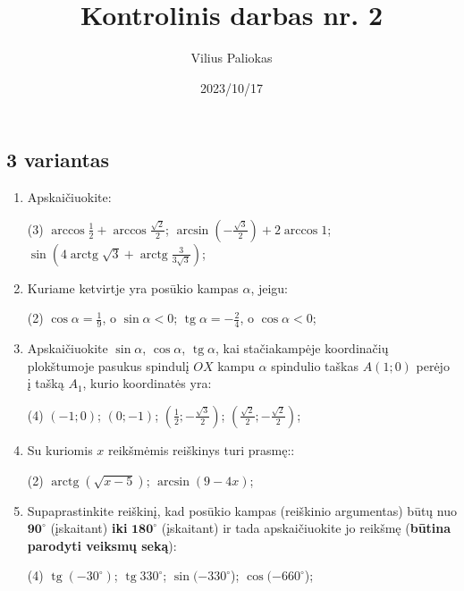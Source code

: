 \documentclass[a4paper]{article}
\title{Kontrolinis darbas nr. 2}
\author{Vilius Paliokas}
\date{2023/10/17}
\DeclareMathOperator{\tg}{tg}
\DeclareMathOperator{\arctg}{arctg}
\begin{document}
\thispagestyle{empty}
\subsection*{3 variantas}

\begin{enumerate}
      \item Apskaičiuokite:

            \begin{tasks}[item-format={\normalfont}, after-item-skip=4mm](3)
                  \task $\arccos{\frac{1}{2}} + \arccos{\frac{\sqrt{2}}{2}} $;
                  \task $\arcsin{(-\frac{\sqrt{3}}{2})} + 2\arccos{1} $;
                  \task $\sin({4\arctg{\sqrt{3}} +
                              \arctg{\frac{3}{3\sqrt{3}}}})  $;

            \end{tasks}

      \item Kuriame ketvirtje yra posūkio kampas $\alpha$, jeigu:
            \begin{tasks}[item-format={\normalfont}, after-item-skip=4mm](2)
                  \task $\cos \alpha = \frac{1}{9}$, o $\sin \alpha < 0$;
                  \task $\tg \alpha = -\frac{2}{4}$, o $\cos \alpha < 0$;
            \end{tasks}
      \item Apskaičiuokite $\sin \alpha$, $\cos \alpha$, $\tg \alpha$, kai
            stačiakampėje koordinačių plokštumoje pasukus spindulį $OX$ kampu
            $\alpha$ spindulio taškas $A(1; 0)$ perėjo į tašką $A_{1}$, kurio
            koordinatės
            yra:
            \begin{tasks}[item-format={\normalfont}, after-item-skip=4mm](4)
                  \task $(-1; 0)$;
                  \task $(0; -1)$;
                  \task $(\frac{1}{2}; -\frac{\sqrt{3}}{2})$;
                  \task $(\frac{\sqrt{2}}{2}; -\frac{\sqrt{2}}{2})$;
            \end{tasks}

      \item Su kuriomis $x$ reikšmėmis reiškinys turi prasmę::
            \begin{tasks}[item-format={\normalfont},
                        after-item-skip=4mm](2)
                  \task $\arctg(\sqrt{x-5})$;
                  \task $\arcsin(9-4x)$;
            \end{tasks}

      \item Supaprastinkite reiškinį, kad posūkio kampas (reiškinio argumentas) būtų nuo
            \textbf{$\boldsymbol{90^\circ}$} (įskaitant)
                  \textbf{iki}  $\boldsymbol{180^\circ}$ (įskaitant) ir tada apskaičiuokite jo
            reikšmę
            (\textbf{būtina parodyti veiksmų seką}):
            \begin{tasks}[item-format={\normalfont},
                        after-item-skip=4mm](4)
                  \task $\tg (-30^\circ)$;
                  \task $\tg 330^\circ$;
                  \task $\sin (-330^\circ$);
                  \task $\cos (-660^\circ$);
            \end{tasks}


\end{enumerate}
\end{document}
